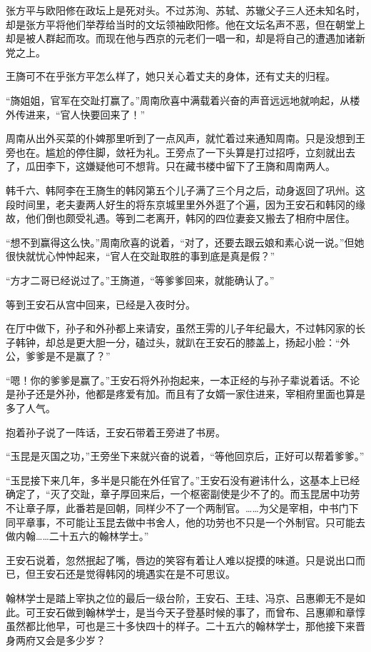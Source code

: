 张方平与欧阳修在政坛上是死对头。不过苏洵、苏轼、苏辙父子三人还未知名时，却是张方平将他们举荐给当时的文坛领袖欧阳修。他在文坛名声不恶，但在朝堂上却是被人群起而攻。而现在他与西京的元老们一唱一和，却是将自己的遭遇加诸新党之上。

王旖可不在乎张方平怎么样了，她只关心着丈夫的身体，还有丈夫的归程。

“旖姐姐，官军在交趾打赢了。”周南欣喜中满载着兴奋的声音远远地就响起，从楼外传进来，“官人快要回来了！”

周南从出外买菜的仆婢那里听到了一点风声，就忙着过来通知周南。只是没想到王旁也在。尴尬的停住脚，敛衽为礼。王旁点了一下头算是打过招呼，立刻就出去了，瓜田李下，这嫌疑他可不想背。只在藏书楼中留下了王旖和周南两人。

韩千六、韩阿李在王旖生的韩冈第五个儿子满了三个月之后，动身返回了巩州。这段时间里，老夫妻两人好生的将东京城里里外外逛了个遍，因为王安石和韩冈的缘故，他们倒也颇受礼遇。等到二老离开，韩冈的四位妻妾又搬去了相府中居住。

“想不到赢得这么快。”周南欣喜的说着，“对了，还要去跟云娘和素心说一说。”但她很快就忧心忡忡起来，“官人在交趾取胜的事到底是真是假？”

“方才二哥已经说过了。”王旖道，“等爹爹回来，就能确认了。”

等到王安石从宫中回来，已经是入夜时分。

在厅中做下，孙子和外孙都上来请安，虽然王雱的儿子年纪最大，不过韩冈家的长子韩钟，却总是更大胆一分，磕过头，就趴在王安石的膝盖上，扬起小脸：“外公，爹爹是不是赢了？”

“嗯！你的爹爹是赢了。”王安石将外孙抱起来，一本正经的与孙子辈说着话。不论是孙子还是外孙，他都是疼爱有加。而且有了女婿一家住进来，宰相府里面也算是多了人气。

抱着孙子说了一阵话，王安石带着王旁进了书房。

“玉昆是灭国之功，”王旁坐下来就兴奋的说着，“等他回京后，正好可以帮着爹爹。”

“玉昆接下来几年，多半是只能在外任官了。”王安石没有避讳什么，这基本上已经确定了，“灭了交趾，章子厚回来后，一个枢密副使是少不了的。而玉昆居中功劳不让章子厚，此番若是回朝，同样少不了一个两制官。……为父是宰相，中书门下同平章事，不可能让玉昆去做中书舍人，他的功劳也不只是一个外制官。只可能去做内翰……二十五六的翰林学士。”

王安石说着，忽然抿起了嘴，唇边的笑容有着让人难以捉摸的味道。只是说出口而已，但王安石还是觉得韩冈的境遇实在是不可思议。

翰林学士是踏上宰执之位的最后一级台阶，王安石、王珪、冯京、吕惠卿无不是如此。可王安石做到翰林学士，是当今天子登基时候的事了，而曾布、吕惠卿和章惇虽然都比他早，可也是三十多快四十的样子。二十五六的翰林学士，那他接下来晋身两府又会是多少岁？

